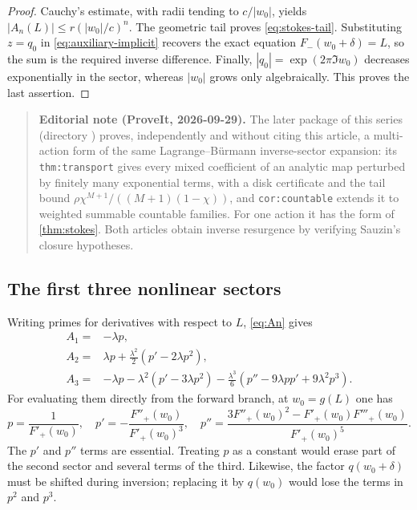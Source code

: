 \documentclass[11pt,a4paper]{article}
\theoremstyle{definition}
\numberwithin{equation}{section}
\begin{document}
\begin{proof}
Cauchy's estimate, with radii tending to $c/|w_0|$, yields
$|A_n(L)|\le r(|w_0|/c)^n$. The geometric tail proves \eqref{eq:stokes-tail}. Substituting $z=q_0$ in \eqref{eq:auxiliary-implicit} recovers the exact equation $F_-(w_0+\delta)=L$, so the sum is the required inverse difference. Finally, $|q_0|=\exp(2\pi\Im w_0)$ decreases exponentially in the sector, whereas $|w_0|$ grows only algebraically. This proves the last assertion.
\end{proof}

\begin{quote}\small\textbf{Editorial note (ProveIt, 2026-09-29).} The later package  of this series (directory ) proves, independently and without citing this article, a multi-action form of the same Lagrange--B\"urmann inverse-sector expansion: its \texttt{thm:transport} gives every mixed coefficient of an analytic map perturbed by finitely many exponential terms, with a disk certificate and the tail bound $\rho\chi^{M+1}/((M+1)(1-\chi))$, and \texttt{cor:countable} extends it to weighted summable countable families. For one action it has the form of \cref{thm:stokes}. Both articles obtain inverse resurgence by verifying Sauzin's closure hypotheses.\end{quote}

\subsection{The first three nonlinear sectors}
Writing primes for derivatives with respect to $L$, \eqref{eq:An} gives
\begin{align}
 A_1={}&-\lambda p,\label{eq:A1}\\
 A_2={}&\lambda p+\frac{\lambda^2}{2}
                     (p'-2\lambda p^2),\label{eq:A2}\\
 A_3={}&-\lambda p-\lambda^2(p'-3\lambda p^2)
       -\frac{\lambda^3}{6}
                   (p''-9\lambda pp'+9\lambda^2p^3).
 \label{eq:A3}
\end{align}
For evaluating them directly from the forward branch, at $w_0=g(L)$ one has
\begin{equation}
 p=\frac1{F'_+(w_0)},\quad
 p'=-\frac{F''_+(w_0)}{F'_+(w_0)^3},\quad
 p''=\frac{3F''_+(w_0)^2-F'_+(w_0)F'''_+(w_0)}{F'_+(w_0)^5}.
 \label{eq:pderivs}
\end{equation}
The $p'$ and $p''$ terms are essential. Treating $p$ as a constant would erase part of the second sector and several terms of the third. Likewise, the factor $q(w_0+\delta)$ must be shifted during inversion; replacing it by $q(w_0)$ would lose the terms in $p^2$ and $p^3$.
\end{document}
